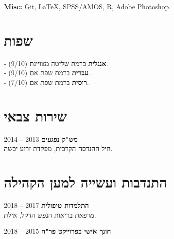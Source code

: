 \documentclass[
	12pt,a4paper %
]{article}
\begin{document}
\begin{hebrew}
\begin{paracol}{2}
\textbf{Misc:} \href{https://github.com/kiril-u}{Git}, LaTeX, SPSS/AMOS, R, Adobe Photoshop.

		\unsetLTR
		\setRTL
		\switchcolumn

		\section{שפות}
		- \textbf{אנגלית} ברמת שליטה מצויינת (9/10). \\
		- \textbf{עברית} ברמת שפת אם (9/10). \\
		- \textbf{רוסית} ברמת שפת אם (7/10).

		\section{שירות צבאי}
		\textbf{מש"ק נפגעים} \hfill 2013 -- 2014 \\
		חיל ההנדסה הקרבית, מפקדת זרוע יבשה.

		\section{התנדבות ועשייה למען הקהילה}

		\textbf{התלמדות טיפולית} \hfill 2017 -- 2018 \\
		מרפאת בריאות הנפש הדקל, אילת.

		\textbf{חונך אישי בפרוייקט פר"ח} \hfill 2015 -- 2018
	\end{paracol} %
\end{hebrew}
\unsetRTL
\end{document}
